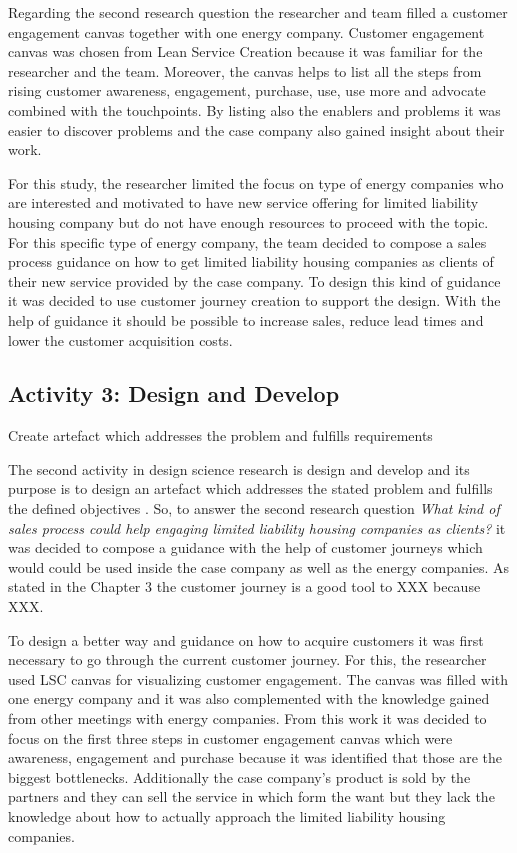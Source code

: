 Regarding the second research question the researcher and team filled a customer engagement canvas together with one energy company. Customer engagement canvas was chosen from Lean Service Creation because it was familiar for the researcher and the team. Moreover, the canvas helps to list all the steps from rising customer awareness, engagement, purchase, use, use more and advocate combined with the touchpoints. By listing also the enablers and problems it was easier to discover problems and the case company also gained insight about their work. 

For this study, the researcher limited the focus on type of energy companies who are interested and motivated to have new service offering for limited liability housing company but do not have enough resources to proceed with the topic. For this specific type of energy company, the team decided to compose a sales process guidance on how to get limited liability housing companies as clients of their new service provided by the case company. To design this kind of guidance it was decided to use customer journey creation to support the design. With the help of guidance it should be possible to increase sales, reduce lead times and lower the customer acquisition costs.

\subsection{Activity 3: Design and Develop}
Create artefact which addresses the problem and fulfills requirements

The second activity in design science research is design and develop and its purpose is to design an artefact which addresses the stated problem and fulfills the defined objectives \parencite{Johannesson:2014}. So, to answer the second research question \emph{What kind of sales process could help engaging limited liability housing companies as clients?} it was decided to compose a guidance with the help of customer journeys which would could be used inside the case company as well as the energy companies. As stated in the Chapter 3 the customer journey is a good tool to XXX because XXX.

To design a better way and guidance on how to acquire customers it was first necessary to go through the current customer journey. For this, the researcher used LSC canvas for visualizing customer engagement. The canvas was filled with one energy company and it was also complemented with the knowledge gained from other meetings with energy companies. From this work it was decided to focus on the first three steps in customer engagement canvas which were awareness, engagement and purchase because it was identified that those are the biggest bottlenecks. Additionally the case company's product is sold by the partners and they can sell the service in which form the want but they lack the knowledge about how to actually approach the limited liability housing companies.

